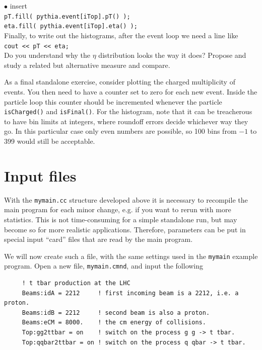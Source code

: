 \documentclass[12pt,a4paper]{article}
\newenvironment{Itemize}{\begin{list}{$\bullet$}%
{\setlength{\topsep}{0.4mm}\setlength{\partopsep}{0.4mm}%
\setlength{\itemsep}{0.4mm}\setlength{\parsep}{0.4mm}}}%
{\end{list}}
\begin{document}
\begin{Itemize}
insert \\
\hspace*{10mm}\texttt{pT.fill( pythia.event[iTop].pT() );}\\
\hspace*{10mm}\texttt{eta.fill( pythia.event[iTop].eta() );}\\
Finally, to write out the histograms, after the event loop we need
a line like\\
\hspace*{10mm}\texttt{cout << pT << eta;}\\
Do you understand why the $\eta$ distribution looks the way it does?
Propose and study a related but alternative measure and compare.
\item As a final standalone exercise, consider plotting the charged 
multiplicity of events. You then need to have a counter set to zero
for each new event. Inside the particle loop this counter should
be incremented whenever the particle \texttt{isCharged()} and
\texttt{isFinal()}. For the histogram, note that it can be treacherous to
have bin limits at integers, where roundoff errors decide whichever way
they go. In this particular case only even numbers are possible, so 100
bins from $-1$ to 399 would still be acceptable.
\end{Itemize}

\section{Input files}

With the \texttt{mymain.cc} structure developed above it is necessary to
recompile the main program for each minor change, e.g. if you want to
rerun with more statistics. This is not time-consuming for a simple 
standalone run, but may become so for more realistic applications.
Therefore, parameters can be put in special input ``card'' files
that are read by the main program. 

We will now create such a file, with the same settings used in the
\texttt{mymain} example program. Open a new file, \texttt{mymain.cmnd}, and
input the following
\begin{verbatim}
     ! t tbar production at the LHC
     Beams:idA = 2212     ! first incoming beam is a 2212, i.e. a proton.  
     Beams:idB = 2212     ! second beam is also a proton. 
     Beams:eCM = 8000.    ! the cm energy of collisions. 
     Top:gg2ttbar = on    ! switch on the process g g -> t tbar.  
     Top:qqbar2ttbar = on ! switch on the process q qbar -> t tbar.  
\end{verbatim}
\end{document}
